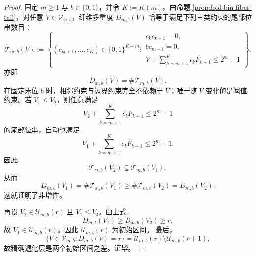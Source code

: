 \begin{proof}
固定 \(m\ge 1\) 与 \(b\in\{0,1\}\)，并令 \(K:=K(m)\)。由命题 \ref{prop:fold-bin-fiber-tail}，对任意 \(V\in\mathcal V_{m,b}\)，纤维多重度 \(D_{m,b}(V)\) 恰等于满足下列三类约束的尾部位串数目：
\[
\mathcal T_{m,b}(V):=
\left\{
(c_{m+1},\dots,c_K)\in\{0,1\}^{K-m}:
\begin{array}{l}
c_kc_{k+1}=0,\\[2pt]
bc_{m+1}=0,\\[2pt]
V+\sum_{k=m+1}^{K}c_kF_{k+1}\le 2^m-1
\end{array}
\right\}.
\]
亦即
\[
D_{m,b}(V)=\#\mathcal T_{m,b}(V).
\]
在固定末位 \(b\) 时，相邻约束与边界约束完全不依赖于 \(V\)；唯一随 \(V\) 变化的是阈值约束。若 \(V_1\le V_2\)，则任意满足
\[
V_2+\sum_{k=m+1}^{K}c_kF_{k+1}\le 2^m-1
\]
的尾部位串，自动也满足
\[
V_1+\sum_{k=m+1}^{K}c_kF_{k+1}\le 2^m-1.
\]
因此
\[
\mathcal T_{m,b}(V_2)\subseteq \mathcal T_{m,b}(V_1),
\]
从而
\[
D_{m,b}(V_1)=\#\mathcal T_{m,b}(V_1)\ge \#\mathcal T_{m,b}(V_2)=D_{m,b}(V_2).
\]
这就证明了非增性。

再设 \(V_2\in\mathcal U_{m,b}(r)\) 且 \(V_1\le V_2\)。由上式，
\[
D_{m,b}(V_1)\ge D_{m,b}(V_2)\ge r,
\]
故 \(V_1\in\mathcal U_{m,b}(r)\)。因此 \(\mathcal U_{m,b}(r)\) 为初始区间。
最后，
\[
\{V\in\mathcal V_{m,b}:D_{m,b}(V)=r\}
=
\mathcal U_{m,b}(r)\setminus \mathcal U_{m,b}(r+1),
\]
故精确退化层是两个初始区间之差。证毕。
\end{proof}

